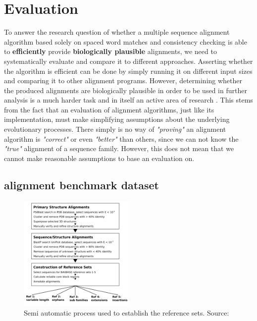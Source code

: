 \chapter{Evaluation}
\label{chap:eval}

To answer the research question of whether a multiple sequence alignment algorithm based solely on spaced word matches and consistency checking is able to \textbf{efficiently} provide \textbf{biologically plausible} alignments, we need to systematically evaluate and compare it to different approaches. Asserting whether the algorithm is efficient can be done by simply running it on different input sizes and comparing it to other alignment programs. However, determining whether the produced alignments are biologically plausible in order to be used in further analysis is a much harder task and in itself an active area of research \cite{edgar2010quality}. This stems from the fact that an evaluation of alignment algorithms, just like its implementation, must make simplifying assumptions about the underlying evolutionary processes. There simply is no way of \textit{"proving"} an alignment algorithm is \textit{"correct"} or even \textit{"better"} than others, since we can not know the \textit{"true"} alignment of a sequence family. However, this does not mean that we cannot make reasonable assumptions to base an evaluation on.

\section{ alignment benchmark dataset}
\label{sec:bb}
\begin{figure}
	\centering
	\includegraphics[width=0.5\textwidth]{./images/balibase.png}
	\caption{Semi automatic process used to establish the reference sets. Source: \cite{hundt2020praktkium}}
	\label{fig:balibase}
\end{figure}


